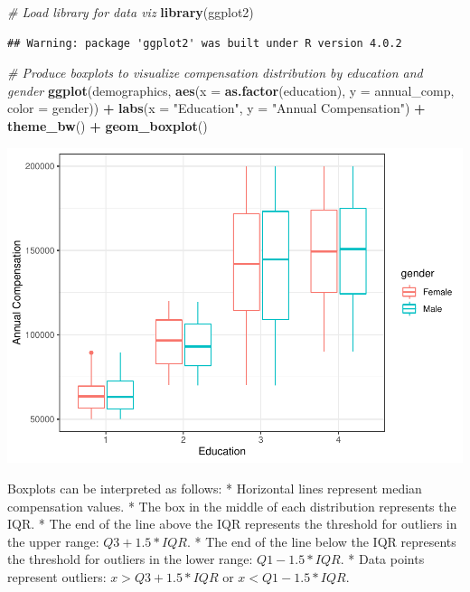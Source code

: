 \documentclass[]{book}
\newenvironment{Shaded}{\begin{snugshade}}{\end{snugshade}}
\newcommand{\CommentTok}[1]{\textcolor[rgb]{0.56,0.35,0.01}{\textit{#1}}}
\newcommand{\DataTypeTok}[1]{\textcolor[rgb]{0.13,0.29,0.53}{#1}}
\newcommand{\KeywordTok}[1]{\textcolor[rgb]{0.13,0.29,0.53}{\textbf{#1}}}
\newcommand{\NormalTok}[1]{#1}
\newcommand{\OperatorTok}[1]{\textcolor[rgb]{0.81,0.36,0.00}{\textbf{#1}}}
\newcommand{\StringTok}[1]{\textcolor[rgb]{0.31,0.60,0.02}{#1}}
\begin{document}
\begin{Shaded}
\begin{Highlighting}[]
\CommentTok{# Load library for data viz}
\KeywordTok{library}\NormalTok{(ggplot2)}
\end{Highlighting}
\end{Shaded}

\begin{verbatim}
## Warning: package 'ggplot2' was built under R version 4.0.2
\end{verbatim}

\begin{Shaded}
\begin{Highlighting}[]
\CommentTok{# Produce boxplots to visualize compensation distribution by education and gender}
\KeywordTok{ggplot}\NormalTok{(demographics, }\KeywordTok{aes}\NormalTok{(}\DataTypeTok{x =} \KeywordTok{as.factor}\NormalTok{(education), }\DataTypeTok{y =}\NormalTok{ annual_comp, }\DataTypeTok{color =}\NormalTok{ gender)) }\OperatorTok{+}
\StringTok{  }\KeywordTok{labs}\NormalTok{(}\DataTypeTok{x =} \StringTok{"Education"}\NormalTok{, }\DataTypeTok{y =} \StringTok{"Annual Compensation"}\NormalTok{) }\OperatorTok{+}\StringTok{ }
\StringTok{  }\KeywordTok{theme_bw}\NormalTok{() }\OperatorTok{+}
\StringTok{  }\KeywordTok{geom_boxplot}\NormalTok{()}
\end{Highlighting}
\end{Shaded}

\includegraphics{People_Analytics_Lifecycle_files/figure-latex/unnamed-chunk-18-1.pdf}

Boxplots can be interpreted as follows:
* Horizontal lines represent median compensation values.
* The box in the middle of each distribution represents the IQR.
* The end of the line above the IQR represents the threshold for outliers in the upper range: \(Q3 + 1.5 * IQR\).
* The end of the line below the IQR represents the threshold for outliers in the lower range: \(Q1 - 1.5 * IQR\).
* Data points represent outliers: \(x > Q3 + 1.5 * IQR\) or \(x < Q1 - 1.5 * IQR\).
\end{document}
